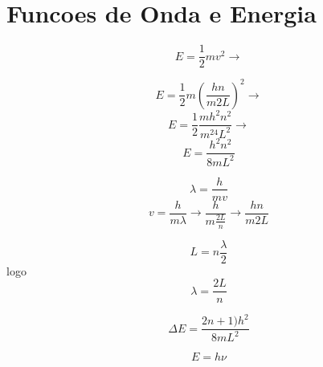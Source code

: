 \documentclass[a4paper,12pt]{article}
\begin{document}
\section{Funcoes de Onda e Energia}



$$E = \frac{1}{2} mv^2 \to $$


$$E = \frac{1}{2} m (\frac{hn}{m2L})^2 \to$$
$$E = \frac{1}{2} \frac{m h^2 n^2}{m^24L^2} \to$$
$$E = \frac{h^2n^2}{8mL^2}$$



$$\lambda = \frac{h}{mv}$$
$$v = \frac{h}{m\lambda} \to \frac{h}{m \frac{2L}{n}} \to \frac{hn}{m2L}$$

$$L = n \frac{\lambda}{2}$$
logo
$$\lambda = \frac{2L}{n}$$


$$\Delta E = \frac{2n+1)h^2}{8mL^2}$$

$$E=h\nu$$
\end{document}
